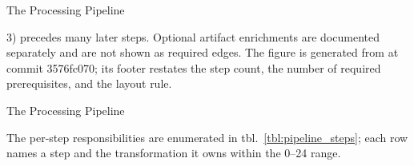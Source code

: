 \documentclass[
  ignorenonframetext,
]{beamer}
\newenvironment{archivecaptionframe}{\par\begingroup}{\par\endgroup}
\begin{document}
\begin{frame}{The Processing Pipeline}

\begin{archivecaptionframe}

3) precedes many later steps. Optional artifact enrichments are
documented separately and are not shown as required edges. The figure is
generated from  at commit 3576fc070; its
footer restates the step count, the number of required prerequisites,
and the layout rule.

\end{archivecaptionframe}

\end{frame}

\begin{frame}{The Processing Pipeline}

The per-step responsibilities are enumerated in
tbl.~\ref{tbl:pipeline_steps}; each row names a step and the
transformation it owns within the 0--24 range.

\end{frame}
\end{document}
